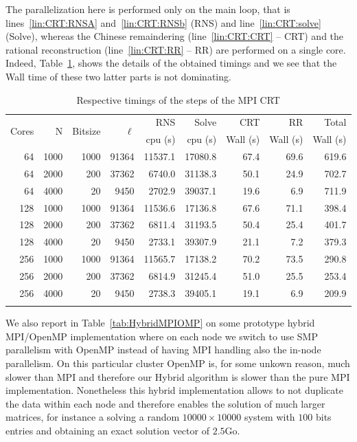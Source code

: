 The parallelization here is performed only on the main loop,
that is lines~\ref{lin:CRT:RNSA} and~\ref{lin:CRT:RNSb} (RNS) and
line~\ref{lin:CRT:solve} (Solve), whereas the Chinese remaindering
(line~\ref{lin:CRT:CRT} -- CRT) 
and the rational reconstruction (line~\ref{lin:CRT:RR} -- RR) are
performed on a single core. 
Indeed, Table~\ref{tab:MPICRT}, shows the details of the obtained
timings and we see that the Wall time of these two latter parts is not
dominating.


\begin{table}[htb]
\renewcommand{\arraystretch}{1.1}
\begin{tabular}{rrrrrrrrr}
\hline
\multirow{2}{*}{Cores} & \multirow{2}{*}{N}& \multirow{2}{*}{Bitsize}
& \multirow{2}{*}{$\ell$}& RNS & Solve & CRT& RR & Total \\
 & &  & & cpu (s) & cpu (s) & Wall (s)& Wall (s) & Wall (s) \\
\hline
 64  & 1000 & 1000 & 91364 & 11537.1 & 17080.8 & 67.4 & 69.6 & 619.6 \\
 64  & 2000 & 200& 37362 & 6740.0 & 31138.3 & 50.1 & 24.9 & 702.7 \\
 64  & 4000 & 20 & 9450& 2702.9 & 39037.1 & 19.6 & 6.9& 711.9 \\
 128 & 1000 & 1000 & 91364 & 11536.6 & 17136.8 & 67.6 & 71.1 & 398.4 \\
 128 & 2000 & 200& 37362 & 6811.4 & 31193.5 & 50.4 & 25.4& 401.7 \\
 128 & 4000 & 20 & 9450& 2733.1 & 39307.9 & 21.1 & 7.2& 379.3 \\
 256 & 1000 & 1000 & 91364 & 11565.7 & 17138.2 & 70.2 & 73.5& 290.8 \\
 256 & 2000 & 200& 37362 & 6814.9 & 31245.4 & 51.0 & 25.5 & 253.4 \\
 256 & 4000 & 20 & 9450& 2738.3 & 39405.1 & 19.1 & 6.9& 209.9 \\
\hline
\vspace{0pt}
\end{tabular}
\caption{Respective timings of the steps of the MPI CRT}\label{tab:MPICRT}
\end{table}

We also report in Table~\ref{tab:HybridMPIOMP} on some prototype
hybrid MPI/OpenMP implementation where on each node we switch to use
SMP parallelism with OpenMP instead of having MPI handling also the
in-node parallelism. On this particular cluster OpenMP is, for some
unkown reason, much slower than MPI and therefore our Hybrid algorithm
is slower than the pure MPI implementation. Nonetheless this hybrid
implementation allows to not duplicate the data within each node and
therefore enables the solution of much larger matrices, for instance a
solving a random $10000{\times}10000$ system with $100$ bits entries
and obtaining an exact solution vector of $2.5$Go.

